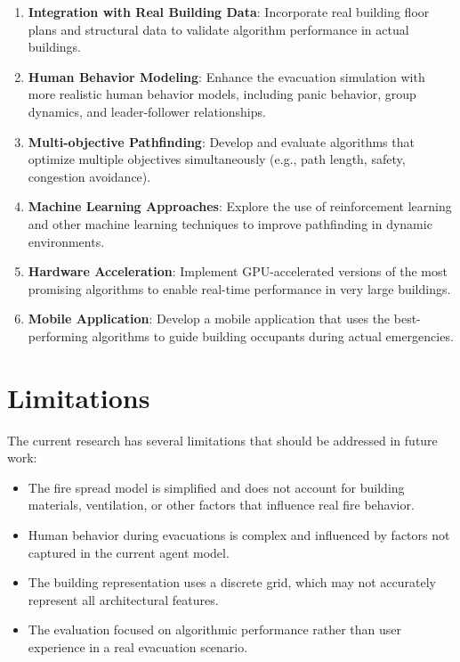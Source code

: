 \documentclass[11pt,a4paper]{report}
\begin{document}
\begin{enumerate}
    \item \textbf{Integration with Real Building Data}: Incorporate real building floor plans and structural data to validate algorithm performance in actual buildings.
    
    \item \textbf{Human Behavior Modeling}: Enhance the evacuation simulation with more realistic human behavior models, including panic behavior, group dynamics, and leader-follower relationships.
    
    \item \textbf{Multi-objective Pathfinding}: Develop and evaluate algorithms that optimize multiple objectives simultaneously (e.g., path length, safety, congestion avoidance).
    
    \item \textbf{Machine Learning Approaches}: Explore the use of reinforcement learning and other machine learning techniques to improve pathfinding in dynamic environments.
    
    \item \textbf{Hardware Acceleration}: Implement GPU-accelerated versions of the most promising algorithms to enable real-time performance in very large buildings.
    
    \item \textbf{Mobile Application}: Develop a mobile application that uses the best-performing algorithms to guide building occupants during actual emergencies.
\end{enumerate}

\section{Limitations}
The current research has several limitations that should be addressed in future work:

\begin{itemize}
    \item The fire spread model is simplified and does not account for building materials, ventilation, or other factors that influence real fire behavior.
    
    \item Human behavior during evacuations is complex and influenced by factors not captured in the current agent model.
    
    \item The building representation uses a discrete grid, which may not accurately represent all architectural features.
    
    \item The evaluation focused on algorithmic performance rather than user experience in a real evacuation scenario.
\end{itemize}
\end{document}
